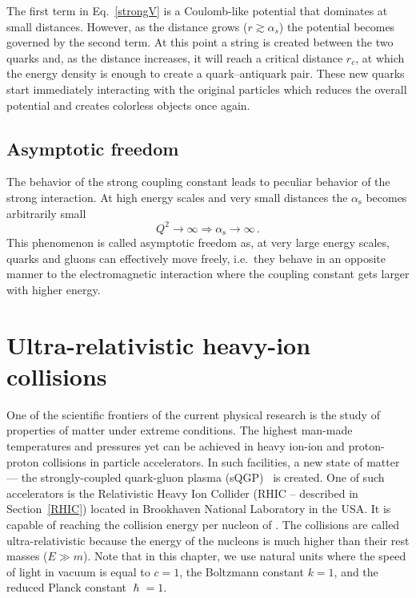 The first term in Eq.\ \eqref{strongV} is a Coulomb-like potential that dominates at small distances. However, as the distance grows ($r \gtrsim \alpha_s$) the potential becomes governed by the second term.  At this point a string is created between the two quarks and, as the distance increases, it will reach a critical distance $r_c$, at which the energy density is enough to create a quark--antiquark pair. These new quarks start immediately interacting with the original particles which reduces the overall potential and creates colorless objects once again.

\subsection{Asymptotic freedom}

The behavior of the strong coupling constant leads to peculiar behavior of the strong interaction. At high energy scales and very small distances the $\alpha_\mathrm{s}$ becomes arbitrarily small
\begin{equation}
 Q^2 \rightarrow \infty \Rightarrow \alpha_\mathrm{s} \rightarrow \infty\,.
\end{equation}
This phenomenon is called asymptotic freedom as, at very large energy scales, quarks and gluons can effectively move freely, i.e.\ they behave in an opposite manner to the electromagnetic interaction where the coupling constant gets larger with higher energy.


\section{Ultra-relativistic heavy-ion collisions}
One of the scientific frontiers of the current physical research is the study of properties of matter under extreme conditions. The highest man-made temperatures and pressures yet can be achieved in heavy ion-ion and proton-proton collisions in particle accelerators.
In such facilities, a new state of matter --- the strongly-coupled quark-gluon plasma (sQGP)~\cite{QGPdiscovered} is created\@. One of such accelerators is the Relativistic Heavy Ion Collider (RHIC -- described in Section~\ref{RHIC}) located in Brookhaven National Laboratory in the USA\@. It is capable of reaching the collision energy per nucleon of \snnFull\@. The collisions are called ultra-relativistic because the energy of the nucleons is much higher than their rest masses ($E \gg m$). Note that in this chapter, we use natural units where the speed of light in vacuum is equal to $c = 1$, the Boltzmann constant $k = 1$, and the reduced Planck constant $\hslash = 1$\@. 

